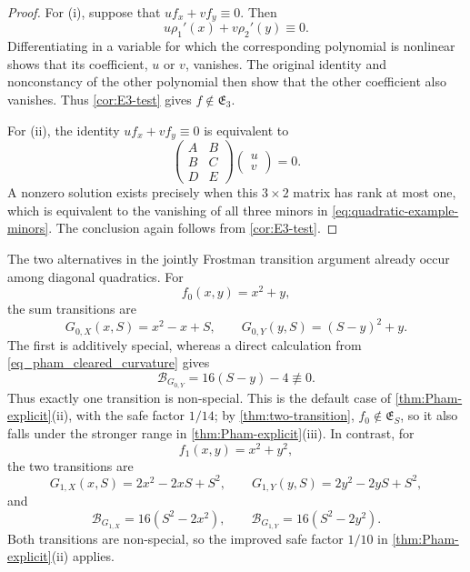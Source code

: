 \documentclass[11pt]{article}
\begin{document}
\begin{proof}
For \textup{(i)}, suppose that
\(u f_x+v f_y\equiv0\).  Then
\[
 u\rho_1'(x)+v\rho_2'(y)\equiv0.
\]
Differentiating in a variable for which the corresponding polynomial
is nonlinear shows that its coefficient, \(u\) or \(v\), vanishes.
The original identity and nonconstancy of the other polynomial then
show that the other coefficient also vanishes.  Thus
\cref{cor:E3-test} gives \(f\notin\mathfrak E_3\).

For \textup{(ii)}, the identity \(u f_x+v f_y\equiv0\) is equivalent
to
\[
 \begin{pmatrix}
 A&B\\ B&C\\ D&E
 \end{pmatrix}
 \begin{pmatrix}u\\v\end{pmatrix}=0.
\]
A nonzero solution exists precisely when this \(3\times2\) matrix
has rank at most one, which is equivalent to the vanishing of all
three minors in \eqref{eq:quadratic-example-minors}.  The conclusion
again follows from \cref{cor:E3-test}.
\end{proof}

The two alternatives in the jointly Frostman transition argument
already occur among diagonal quadratics.  For
\[
 f_0(x,y)=x^2+y,
\]
the sum transitions are
\[
 G_{0,X}(x,S)=x^2-x+S,
 \qquad
 G_{0,Y}(y,S)=(S-y)^2+y.
\]
The first is additively special, whereas a direct calculation from
\eqref{eq_pham_cleared_curvature} gives
\[
 \mathcal B_{G_{0,Y}}=16(S-y)-4\not\equiv0.
\]
Thus exactly one transition is non-special.  This is the default
case of \cref{thm:Pham-explicit}\textup{(ii)}, with the safe factor
\(1/14\); by \cref{thm:two-transition},
\(f_0\notin\mathfrak E_S\), so it also falls under the
stronger range in \cref{thm:Pham-explicit}\textup{(iii)}.  In
contrast, for
\[
 f_1(x,y)=x^2+y^2,
\]
the two transitions are
\[
 G_{1,X}(x,S)=2x^2-2xS+S^2,
 \qquad
 G_{1,Y}(y,S)=2y^2-2yS+S^2,
\]
and
\[
 \mathcal B_{G_{1,X}}=16(S^2-2x^2),
 \qquad
 \mathcal B_{G_{1,Y}}=16(S^2-2y^2).
\]
Both transitions are non-special, so the improved safe factor
\(1/10\) in \cref{thm:Pham-explicit}\textup{(ii)} applies.
\end{document}
